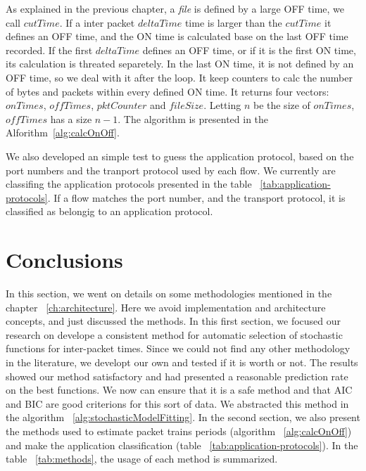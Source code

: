 As explained in the previous chapter, a \textit{file} is defined by a large OFF time, we call $cutTime$. If a inter packet $deltaTime$ time is larger than the $cutTime$ it defines an OFF time, and the ON time is calculated base on the last OFF time recorded. 
If the first $deltaTime$ defines an OFF time, or if it is the first ON time, its calculation is threated separetely. In the last ON time, it is not defined by an OFF time, so we deal with it after the loop. It keep counters to calc the number of bytes and packets within every defined ON time. It returns four vectors: $onTimes$, $offTimes$, $pktCounter$ and $fileSize$. Letting $n$ be the size of $onTimes$,  $offTimes$ has a size $n - 1$. The algorithm is presented in the Alforithm~\ref{alg:calcOnOff}.



We also developed an simple test to guess the application protocol, based on the port numbers and the tranport protocol used by each flow. We currently are classifing the application protocols presented in the table ~\ref{tab:application-protocols}. If a flow matches the port number, and the transport protocol, it is classified as belongig to an application protocol.

\section{Conclusions}

In this section, we went on details on some methodologies mentioned in the chapter ~\ref{ch:architecture}. Here we avoid implementation and architecture concepts, and just discussed the methods. In this first section, we focused our research on develope a consistent method for automatic selection of stochastic functions for inter-packet times. Since we could not find any other methodology in the literature, we developt our own and tested if it is worth or not. The results showed our method satisfactory and had presented a reasonable prediction rate on the best functions. We now can ensure that it is a safe method and that AIC and BIC are good criterions for this sort of data.  We abstracted this method in the algorithm ~\ref{alg:stochasticModelFitting}. In the second section, we also present the methods used to estimate packet trains periods (algorithm ~\ref{alg:calcOnOff}) and make the application classification (table ~\ref{tab:application-protocols}). In the table ~\ref{tab:methods}, the usage of each method is summarized. 

